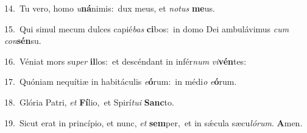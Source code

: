{\numbfont\textcolor{\numbcolor}{14.}}~Tu vero, homo \textit{u}\-\textbf{ná}nimis:~\star dux meus, et \textit{no}\-\textit{tus} \textbf{me}\-us.\par
{\numbfont\textcolor{\numbcolor}{15.}}~Qui simul mecum dulces capié\textit{bas} \textbf{ci}\-bos:~\star in domo Dei ambulávimus \textit{cum} \textit{con}\-\textbf{sén}su.\par
{\numbfont\textcolor{\numbcolor}{16.}}~Véniat mors su\textit{per} \textbf{il}\-los:~\star et descéndant in infér\textit{num} \textit{vi}\-\textbf{vén}tes:\par
{\numbfont\textcolor{\numbcolor}{17.}}~Quóniam nequítiæ in habitáculis \textit{e}\-\textbf{ó}rum:~\star in médi\textit{o} \textit{e}\-\textbf{ó}rum.\par
{\numbfont\textcolor{\numbcolor}{18.}}~Glória Patri, \textit{et} \textbf{Fí}\-lio,~\star et Spirí\-\textit{tu}\-\textit{i} \textbf{Sanc}\-to.\par
{\numbfont\textcolor{\numbcolor}{19.}}~Sicut erat in princípio, et nunc, \textit{et} \textbf{sem}\-per,~\star et in sǽcula sæcu\-\textit{ló}\-\textit{rum}. \textbf{A}\-men.\par
